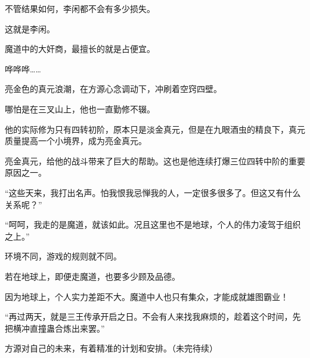\begin{this_body}
不管结果如何，李闲都不会有多少损失。

这就是李闲。

魔道中的大奸商，最擅长的就是占便宜。

哗哗哗……

亮金色的真元浪潮，在方源心念调动下，冲刷着空窍四壁。

哪怕是在三叉山上，他也一直勤修不辍。

他的实际修为只有四转初阶，原本只是淡金真元，但是在九眼酒虫的精良下，真元质量提高一个小境界，成为亮金真元。

亮金真元，给他的战斗带来了巨大的帮助。这也是他连续打爆三位四转中阶的重要原因之一。

“这些天来，我打出名声。怕我恨我忌惮我的人，一定很多很多了。但这又有什么关系呢？”

“呵呵，我走的是魔道，就该如此。况且这里也不是地球，个人的伟力凌驾于组织之上。”

环境不同，游戏的规则就不同。

若在地球上，即便走魔道，也要多少顾及品德。

因为地球上，个人实力差距不大。魔道中人也只有集众，才能成就雄图霸业！

“再过两天，就是三王传承开启之日。不会有人来找我麻烦的，趁着这个时间，先把横冲直撞蛊合炼出来罢。”

方源对自己的未来，有着精准的计划和安排。（未完待续）

\end{this_body}

